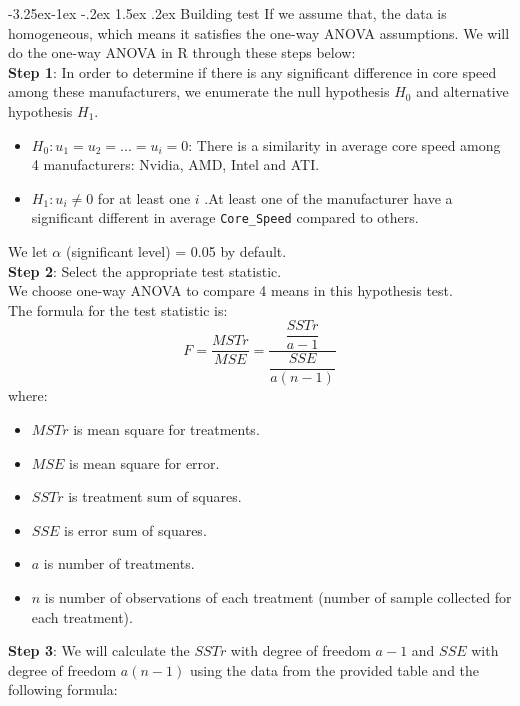 \documentclass[a4paper]{article}
\makeatletter
\newcounter {subsubsubsection}[subsubsection]
\newcommand\subsubsubsection{\@startsection{subsubsubsection}{4}{\z@}%
                                     {-3.25ex\@plus -1ex \@minus -.2ex}%
                                     {1.5ex \@plus .2ex}%
                                     {\normalfont\normalsize\bfseries}}
\makeatother
\begin{document}
\subsubsubsection{Building test}
If we assume that, the data is homogeneous, which means it satisfies the one-way ANOVA assumptions. We will do the one-way ANOVA in R through these steps below:\bigskip\\
\textbf{Step 1}: In order to determine if there is any significant difference in core speed among these manufacturers, we enumerate the null hypothesis $H_0$ and alternative hypothesis $H_1$.
\begin{itemize}
    \item $H_0: u_1=u_2=...=u_i=0$: There is a similarity in average core speed among 4 manufacturers: Nvidia, AMD, Intel and ATI.
    \item $H_1: u_i \neq 0$ for at least one $i$ .At least one of the manufacturer have a significant different in average \verb|Core_Speed| compared to others.
\end{itemize}
We let $\alpha$ (significant level) = 0.05 by default.\bigskip\\
\textbf{Step 2}: Select the appropriate test statistic.\\
We choose one-way ANOVA to compare 4 means in this hypothesis test.\\
The formula for the test statistic is:
\begin{equation*}
F=\dfrac{MSTr}{MSE}=\dfrac{\dfrac{SSTr}{a-1}}{\dfrac{SSE}{a(n-1)}}
\end{equation*}
where:
\begin{itemize}
    \item $MSTr$ is mean square for treatments.
    \item $MSE$ is mean square for error.
    \item $SSTr$ is treatment sum of squares.
    \item $SSE$ is error sum of squares.
    \item $a$ is number of treatments.
    \item $n$ is number of observations of each treatment (number of sample collected for each treatment).
\end{itemize}
\bigskip
\textbf{Step 3}:  We will calculate the $SSTr$ with degree of freedom $a - 1$ and $SSE$ with degree of freedom $a(n-1)$ using the data from the provided table and the following formula:
\end{document}
